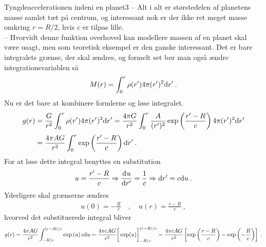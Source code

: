 \begin{opgave}{Tyngdeaccelerationen indeni en planet}{3}
-- \; Alt i alt er størstedelen af planetens masse samlet tæt på centrum, og interessant nok er der ikke ret meget masse omkring $r = R/2$, hvis $c$ er tilpas lille. \\
-- \; Hvorvidt denne funktion overhoved kan modellere massen af en planet skal være usagt, men som teoretisk eksempel er den ganske interessant.
\opg Det er bare integralets grænse, der skal ændres, og formelt set bør man også ændre integrationsvariablen så
\begin{align*}
    M(r) = \int_0^r\rho(r')4\pi (r')^2\d r' \: .
\end{align*}
\opg Nu er det bare at kombinere formlerne og løse integralet.
\begin{align*}
    g(r) &= \frac{G}{r^2}\int_0^r\rho(r')4\pi (r')^2\d r' = \frac{4\pi G}{r^2}\int_0^r\frac{A}{(r')^2}\exp\left(\frac{r'-R}{c}\right)4\pi(r')^2\d r' \\[1mm]
    &= \frac{4\pi AG}{r^2}\int_0^r\exp\left(\frac{r'-R}{c}\right) \d r' \: .
\end{align*}
For at løse dette integral benyttes en substitution
\begin{align*}
    u = \frac{r'-R}{c} \Rightarrow \dif{r'}{u} = \frac{1}{c} \Rightarrow \d r' = c\d u \: .
\end{align*}
Yderligere skal grænserne ændres
\begin{align*}
    u(0) = -\frac{R}{c} \quad , \quad u(r) = \frac{r-R}{c} \: ,
\end{align*}
hvorved det substituerede integral bliver
\begin{align*}
    g(r) = \frac{4\pi AG}{r^2} \int_{-R/c}^{(r-R)/c} \exp\left(u\right)c \d u = \frac{4\pi cAG}{r^2} \bigg[\exp(u)\bigg]_{-R/c}^{(r-R)/c} = \frac{4\pi cAG}{r^2} \left[\exp\left(\frac{r-R}{c}\right) - \exp\left(-\frac{R}{c}\right)\right] \: .
\end{align*}
\end{opgave}